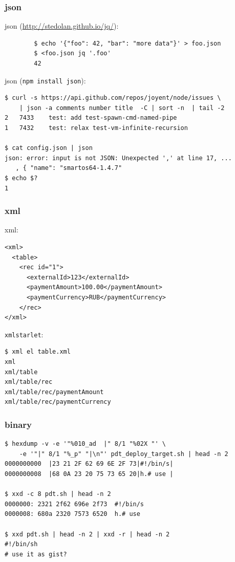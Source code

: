 \documentclass[hyperref={unicode=true}]{beamer}
\begin{document}
\begin{frame}[fragile]
	\frametitle{json}
	json (\url{http://stedolan.github.io/jq/}):
	\begin{addmargin}[1em]{0em}
		\begin{verbatim}
		$ echo '{"foo": 42, "bar": "more data"}' > foo.json
		$ <foo.json jq '.foo'
		42
		\end{verbatim}
	\end{addmargin}

	json (\texttt{npm install json}):
	\begin{addmargin}[1em]{0em}
		\begin{verbatim}
$ curl -s https://api.github.com/repos/joyent/node/issues \
	| json -a comments number title  -C | sort -n  | tail -2
2	7433	test: add test-spawn-cmd-named-pipe
1	7432	test: relax test-vm-infinite-recursion

$ cat config.json | json
json: error: input is not JSON: Unexpected ',' at line 17, ...
   , { "name": "smartos64-1.4.7"
$ echo $?
1
		\end{verbatim}
	\end{addmargin}
\end{frame}

\begin{frame}[fragile]
	\frametitle{xml}
	xml:
	\begin{addmargin}[1em]{0em}
		\begin{verbatim}
<xml>
  <table>
    <rec id="1">
      <externalId>123</externalId>
      <paymentAmount>100.00</paymentAmount>
      <paymentCurrency>RUB</paymentCurrency>
    </rec>
</xml>
		\end{verbatim}
	\end{addmargin}

	\texttt{xmlstarlet}:
	\begin{addmargin}[1em]{0em}
		\begin{verbatim}
$ xml el table.xml
xml
xml/table
xml/table/rec
xml/table/rec/paymentAmount
xml/table/rec/paymentCurrency
		\end{verbatim}
	\end{addmargin}
\end{frame}

\begin{frame}[fragile]
	\frametitle{binary}
	\begin{addmargin}[1em]{0em}
		\begin{verbatim}
$ hexdump -v -e '"%010_ad  |" 8/1 "%02X "' \
	-e '"|" 8/1 "%_p" "|\n"' pdt_deploy_target.sh | head -n 2
0000000000  |23 21 2F 62 69 6E 2F 73|#!/bin/s|
0000000008  |68 0A 23 20 75 73 65 20|h.# use |

$ xxd -c 8 pdt.sh | head -n 2
0000000: 2321 2f62 696e 2f73  #!/bin/s
0000008: 680a 2320 7573 6520  h.# use 

$ xxd pdt.sh | head -n 2 | xxd -r | head -n 2
#!/bin/sh
# use it as gist?
		\end{verbatim}
	\end{addmargin}
\end{frame}
\end{document}
